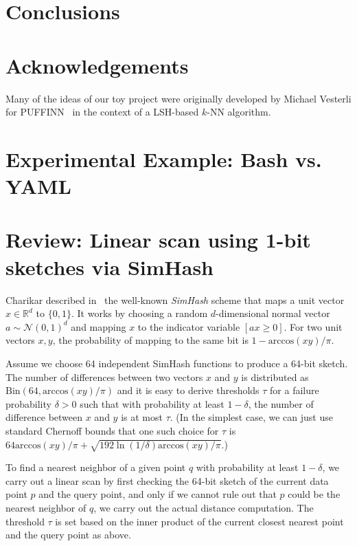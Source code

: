 \documentclass{llncs}
\begin{document}
\section{Conclusions}

\section*{Acknowledgements} Many of the ideas of our toy project were originally developed by Michael Vesterli for PUFFINN~\cite{puffinn} in the context of a LSH-based $k$-NN algorithm.




\appendix

\section{Experimental Example: Bash vs. YAML}
\label{app:experiment-file}

\section{Review: Linear scan using 1-bit sketches via SimHash}
\label{app:sketches}

Charikar described in~\cite{Charikar02} the well-known \emph{SimHash} scheme that maps a unit vector $x \in \mathbb{R}^d$ to $\{0,1\}$. 
It works by choosing a random $d$-dimensional normal vector $a \sim \mathcal{N}(0, 1)^d$   and mapping $x$ to the indicator variable $[ax \geq 0]$. For two unit vectors $x,y$, the probability of mapping to the same bit is $1 - \text{arccos}(xy)/\pi$.

Assume we choose 64 independent SimHash functions to produce a 64-bit sketch. The number of differences between two vectors $x$ and $y$ is distributed as $\text{Bin}(64,\text{arccos}(xy)/\pi )$ and it is easy to derive thresholds $\tau$ for a failure probability $\delta > 0$ such that with probability at least $1-\delta$, the number of difference between $x$ and $y$ is at most $\tau$. (In the simplest case, we can just use standard Chernoff bounds that one such choice for $\tau$ is $64\text{arccos}(xy)/\pi  + \sqrt{192 \ln (1/\delta)\text{arccos}(xy)/\pi}$.)

To find a nearest neighbor of a given point $q$ with probability at least $1-\delta$, we carry out a linear scan by first checking the 64-bit sketch of the current data point $p$ and the query point, and only if we cannot rule out that $p$ could be the nearest neighbor of $q$, we carry out the actual distance computation. The threshold $\tau$ is set based on the inner product of the current closest nearest point and the query point as above.
\end{document}

